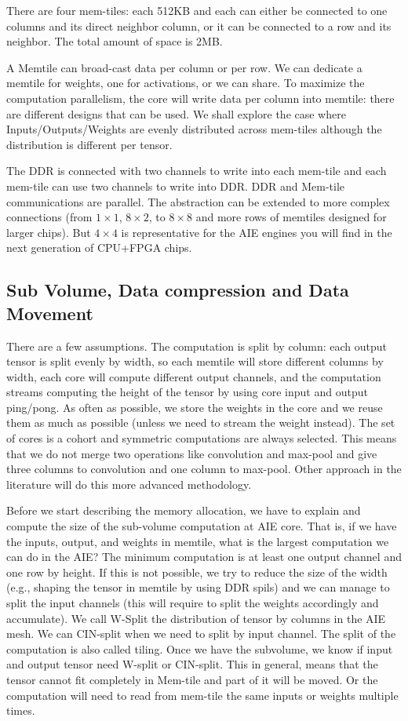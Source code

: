 \documentclass[conference]{IEEEtran}
\begin{document}
There are four mem-tiles: each 512KB and each can either be connected
to one columns and its direct neighbor column, or it can be connected
to a row and its neighbor. The total amount of space is 2MB.

A Memtile can broad-cast data per column or per row. We can dedicate a
memtile for weights, one for activations, or we can share. To maximize
the computation parallelism, the core will write data per column into
memtile: there are different designs that can be used. We shall
explore the case where Inputs/Outputs/Weights are evenly distributed
across mem-tiles although the distribution is different per tensor.

The DDR is connected with two channels to write into each mem-tile and
each mem-tile can use two channels to write into DDR. DDR and Mem-tile
communications are parallel.  The abstraction can be extended to more
complex connections (from $1\times 1$, $8\times 2$, to $8\times 8$ and
more rows of memtiles designed for larger chips). But $4\times 4$ is
representative for the AIE engines you will find in the next
generation of CPU+FPGA chips.


\subsection{Sub Volume, Data compression and Data Movement}
There are a few assumptions. The computation is split by column: each
output tensor is split evenly by width, so each memtile will store
different columns by width, each core will compute different output
channels, and the computation streams computing the height of the
tensor by using core input and output ping/pong. As often as possible,
we store the weights in the core and we reuse them as much as possible
(unless we need to stream the weight instead). The set of cores is a
cohort and symmetric computations are always selected. This means that
we do not merge two operations like convolution and max-pool and give
three columns to convolution and one column to max-pool. Other
approach in the literature will do this more advanced methodology.

Before we start describing the memory allocation, we have to explain
and compute the size of the sub-volume computation at AIE core.  That
is, if we have the inputs, output, and weights in memtile, what is the
largest computation we can do in the AIE? The minimum computation is
at least one output channel and one row by height. If this is not
possible, we try to reduce the size of the width (e.g., shaping the
tensor in memtile by using DDR spils) and we can manage to split the
input channels (this will require to split the weights accordingly and
accumulate). We call W-Split the distribution of tensor by columns in
the AIE mesh. We can CIN-split when we need to split by input channel.
The split of the computation is also called tiling. Once we have the
subvolume, we know if input and output tensor need W-split or
CIN-split. This in general, means that the tensor cannot fit
completely in Mem-tile and part of it will be moved. Or the
computation will need to read from mem-tile the same inputs or weights
multiple times.
\end{document}
